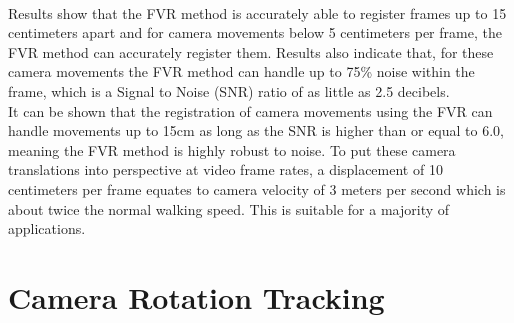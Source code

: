    
\begin{table}[!htb]
\centering
{}
\\
\caption{Translation Tracking}
\label{table:trans}
\end{table}

Results show that the FVR method is accurately able to register frames up to 15 centimeters apart and for camera movements below 5 centimeters per frame, the FVR method can accurately register them. Results also indicate that, for these camera movements the FVR method can handle up to 75\% noise within the frame, which is a Signal to Noise (SNR) ratio of as little as 2.5 decibels. \\

It can be shown that the registration of camera movements using the FVR can handle movements up to 15cm as long as the SNR is higher than or equal to 6.0, meaning the FVR method is highly robust to noise. To put these camera translations into perspective at video frame rates, a displacement of 10 centimeters per frame equates to camera velocity of 3 meters per second which is about twice the normal walking speed. This is suitable for a majority of applications. \\


\section{Camera Rotation Tracking}
\label{Sec:CamRoteTrackExp}

